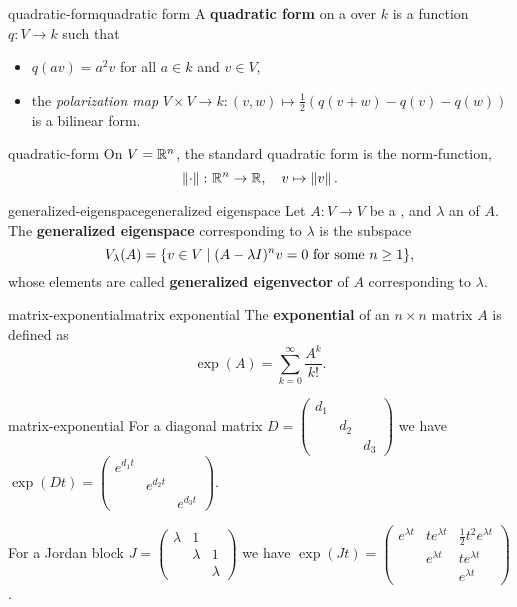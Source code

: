 \begin{topic}{quadratic-form}{quadratic form}
    A \textbf{quadratic form} on a  over $k$ is a function $q \colon V \to k$ such that
    \begin{itemize}
        \item $q(av) = a^2 v$ for all $a \in k$ and $v \in V$,
        \item the \textit{polarization map} $V \times V \to k : (v, w) \mapsto \frac{1}{2}\left( q(v + w) - q(v) - q(w) \right)$ is a bilinear form.
    \end{itemize}
\end{topic}

\begin{example}{quadratic-form}
    On $V = \mathbb{R}^n$, the standard quadratic form is the norm-function,
    \[ \left\|\cdot\right\| \colon \mathbb{R}^n \to \mathbb{R}, \quad v \mapsto \left\|v\right\| . \]
\end{example}

\begin{topic}{generalized-eigenspace}{generalized eigenspace}
    Let $A \colon V \to V$ be a , and $\lambda$ an  of $A$. The \textbf{generalized eigenspace} corresponding to $\lambda$ is the subspace
    \[ V_\lambda(A) = \{ v \in V \mid (A - \lambda I)^n v = 0 \textup{ for some } n \ge 1 \} , \]
    whose elements are called \textbf{generalized eigenvector} of $A$ corresponding to $\lambda$.
\end{topic}

\begin{topic}{matrix-exponential}{matrix exponential}
    The \textbf{exponential} of an $n \times n$ matrix $A$ is defined as
    \[ \exp(A) = \sum_{k = 0}^{\infty} \frac{A^k}{k!} . \]
\end{topic}

\begin{example}{matrix-exponential}
    For a diagonal matrix $D = \begin{pmatrix} d_1 & & \\ & d_2 & \\ & & d_3 \end{pmatrix}$ we have $\exp(D t) = \begin{pmatrix} e^{d_1 t} & & \\ & e^{d_2 t} & \\ & & e^{d_3 t} \end{pmatrix}$.
    
    For a Jordan block $J = \begin{pmatrix} \lambda & 1 & \\ & \lambda & 1 \\ & & \lambda \end{pmatrix}$ we have $\exp(J t) = \begin{pmatrix} e^{\lambda t} & t e^{\lambda t} & \tfrac{1}{2} t^2 e^{\lambda t} \\ & e^{\lambda t} & t e^{\lambda t} \\ & & e^{\lambda t} \end{pmatrix}$.
\end{example}

